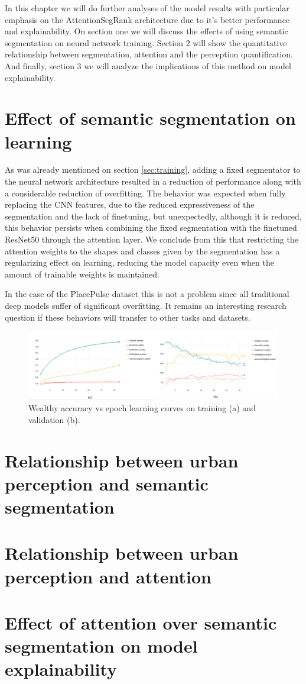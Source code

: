 In this chapter we will do further analyses of the model results with particular
emphasis on the AttentionSegRank architecture due to it's better performance
and explainability. On section one we will discuss the effects of using semantic segmentation
on neural network  training. Section 2 will show the quantitative relationship between
segmentation, attention and the perception quantification. And finally, section 3 we will
analyze the implications of this method on model explainability.

\section{Effect of semantic segmentation on learning}
As was already mentioned on section \ref{sec:training}, adding a fixed segmentator to
the neural network architecture resulted in a reduction of performance along with a considerable
reduction of overfitting. The behavior was expected when fully replacing the CNN features,
due to the reduced expressiveness of the segmentation and the lack of finetuning, but
unexpectedly, although it is reduced, this behavior persists when combining the fixed
segmentation with the finetuned ResNet50 through the attention layer. We conclude from this
that restricting the attention weights to the shapes and classes given by the segmentation
has a regularizing effect on learning, reducing the model capacity even when the amount of trainable
weights is maintained.

In the case of the PlacePulse dataset this is not a problem since
all traditional deep models suffer of significant overfitting. It remains an interesting research
question  if these behaviors will transfer to other tasks and datasets.

\begin{figure}[ht]
	\begin{center}
	\includegraphics[width=1\textwidth]{./figures/wealthy_graph.png}
	\caption[Wealthy Training curves]{
        Wealthy accuracy vs epoch learning curves on training (a) and validation (b).
        }
	\label{fig:wealthy_graph}
	\end{center}
\end{figure}


\section{Relationship between urban perception and semantic segmentation}

\section{Relationship between urban perception and attention}

\section{Effect of attention over semantic segmentation on model explainability}